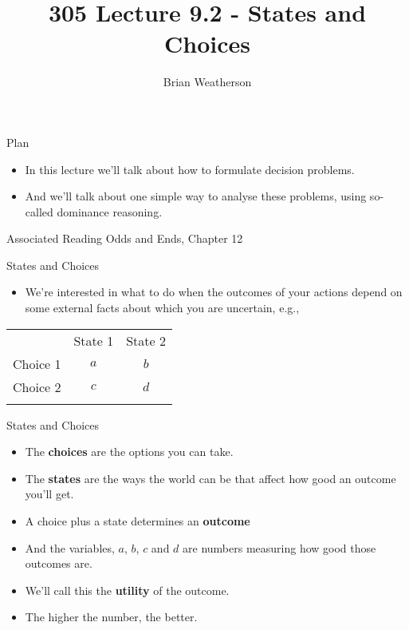 \documentclass[
  ignorenonframetext,
]{beamer}
\title{305 Lecture 9.2 - States and Choices}
\author{Brian Weatherson}
\date{}
\providecommand{\tightlist}{%
  \setlength{\itemsep}{0pt}\setlength{\parskip}{0pt}}
\renewcommand{\,}{\text{, }}
\begin{document}
\frame{\titlepage}

\begin{frame}{Plan}
\protect\hypertarget{plan}{}
\begin{itemize}
\tightlist
\item
  In this lecture we'll talk about how to formulate decision problems.
\item
  And we'll talk about one simple way to analyse these problems, using
  so-called dominance reasoning.
\end{itemize}
\end{frame}

\begin{frame}{Associated Reading}
\protect\hypertarget{associated-reading}{}
Odds and Ends, Chapter 12
\end{frame}

\begin{frame}{States and Choices}
\protect\hypertarget{states-and-choices}{}
\begin{itemize}
\tightlist
\item
  We're interested in what to do when the outcomes of your actions
  depend on some external facts about which you are uncertain, e.g.,
\end{itemize}

\begin{longtable}[]{@{}rcc@{}}
\toprule
& State 1 & State 2 \\ \addlinespace
\midrule
\endhead
Choice 1 & \(a\) & \(b\) \\ \addlinespace
Choice 2 & \(c\) & \(d\) \\ \addlinespace
\bottomrule
\end{longtable}
\end{frame}

\begin{frame}{States and Choices}
\protect\hypertarget{states-and-choices-1}{}
\begin{itemize}
\tightlist
\item
  The \textbf{choices} are the options you can take.
\item
  The \textbf{states} are the ways the world can be that affect how good
  an outcome you'll get.
\item
  A choice plus a state determines an \textbf{outcome}
\item
  And the variables, \(a\), \(b\), \(c\) and \(d\) are numbers measuring
  how good those outcomes are.
\item
  We'll call this the \textbf{utility} of the outcome.
\item
  The higher the number, the better.
\end{itemize}
\end{frame}
\end{document}
